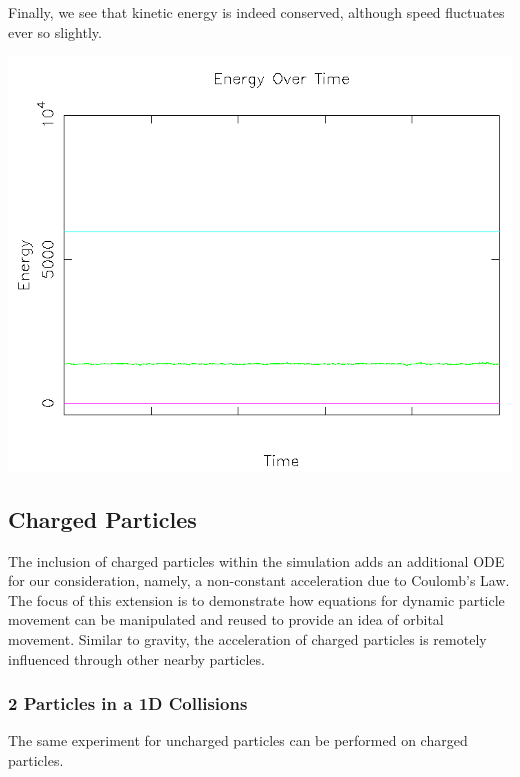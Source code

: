 \documentclass{article}
\begin{document}
Finally, we see that kinetic energy is indeed conserved, although speed fluctuates ever so slightly.
\\
\begin{center}
    \includegraphics[scale=0.5]{uncharged_random_energy}
\end{center}

\subsection{Charged Particles}
The inclusion of charged particles within the simulation adds an additional ODE for our consideration,
namely, a non-constant acceleration due to Coulomb's Law.
The focus of this extension is to demonstrate how equations for dynamic particle movement
can be manipulated and reused to provide an idea of orbital movement.
Similar to gravity, the acceleration of charged particles is remotely influenced through other nearby particles.

\subsubsection{2 Particles in a 1D Collisions}
The same experiment for uncharged particles can be performed on charged particles.
\end{document}
